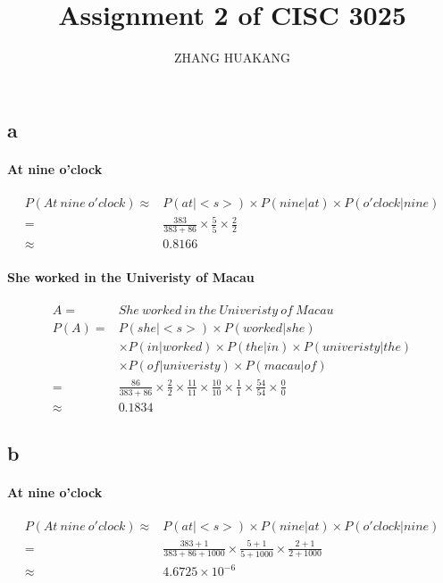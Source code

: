 \documentclass{article}
\title{Assignment 2 of CISC 3025}
\author{ZHANG HUAKANG}
\begin{document}
    \maketitle
    \section{}
    \subsection*{a}
    \paragraph{At nine o'clock}
    \begin{equation}
        \begin{split}
            P(At\  nine\  o'clock)\approx &P(at|<s>)\times P(nine|at)\times P(o'clock|nine)\\
                                    =&\frac{383}{383+86}\times\frac{5}{5}\times\frac{2}{2}\\
                                    \approx&0.8166
        \end{split}
    \end{equation}
    \paragraph{She worked in the Univeristy of Macau}
    \begin{equation}
        \begin{split}
            A=&She\ worked\  in\  the\  Univeristy\  of\  Macau\\
            P(A)=&P(she|<s>)\times P(worked|she)\\
                &\times P(in|worked)\times P(the|in)\times P(univeristy|the)\\
                &\times P(of|univeristy)\times P(macau|of)\\
                =&\frac{86}{383+86}\times\frac{2}{2}\times\frac{11}{11}\times\frac{10}{10}\times\frac{1}{1}\times\frac{54}{54}\times\frac{0}{0}\\
                \approx&0.1834
        \end{split}
    \end{equation}
    \subsection*{b}
    \paragraph{At nine o'clock}
    \begin{equation}
        \begin{split}
            P(At\  nine\  o'clock)\approx &P(at|<s>)\times P(nine|at)\times P(o'clock|nine)\\
                                    =&\frac{383+1}{383+86+1000}\times\frac{5+1}{5+1000}\times\frac{2+1}{2+1000}\\
                                    \approx&4.6725\times 10^{-6}
        \end{split}
    \end{equation}
\end{document}
